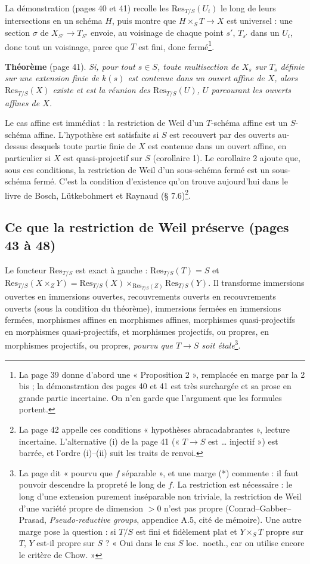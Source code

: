 \documentclass[11pt,a4paper]{article}
\begin{document}
La démonstration (pages 40 et 41) recolle les $\mathrm{Res}_{T/S}(U_i)$ le long de
leurs intersections en un schéma $H$, puis montre que $H \times_S T \to X$ est
universel : une section $\sigma$ de $X_{S'} \to T_{S'}$ envoie, au voisinage de
chaque point $s'$, $T_{s'}$ dans un $U_i$, donc tout un voisinage, parce que
$T$ est fini, donc fermé\footnote{La page 39 donne d'abord une
« Proposition 2 », remplacée en marge par la 2 bis ; la démonstration des
pages 40 et 41 est très surchargée et sa prose en grande partie incertaine.
On n'en garde que l'argument que les formules portent.}.

\textbf{Théorème} (page 41). \emph{Si, pour tout $s \in S$, toute multisection
de $X_s$ sur $T_s$ définie sur une extension finie de $k(s)$ est contenue dans
un ouvert affine de $X$, alors $\mathrm{Res}_{T/S}(X)$ existe et est la réunion
des $\mathrm{Res}_{T/S}(U)$, $U$ parcourant les ouverts affines de $X$.}

Le cas affine est immédiat : la restriction de Weil d'un $T$-schéma affine est
un $S$-schéma affine. L'hypothèse est satisfaite si $S$ est recouvert par
des ouverts au-dessus desquels toute partie finie de $X$ est contenue dans un
ouvert affine, en particulier si $X$ est quasi-projectif sur $S$
(corollaire 1). Le corollaire 2 ajoute que, sous ces conditions, la restriction
de Weil d'un sous-schéma fermé est un sous-schéma fermé. C'est la condition
d'existence qu'on trouve aujourd'hui dans le livre de Bosch, Lütkebohmert et
Raynaud (§ 7.6)\footnote{La page 42 appelle ces conditions « hypothèses
abracadabrantes », lecture incertaine. L'alternative (i) de la page 41 (« $T
\to S$ est \ldots{} injectif ») est barrée, et l'ordre (i)--(ii) suit les
traits de renvoi.}.

\subsection*{Ce que la restriction de Weil préserve (pages 43 à 48)}

Le foncteur $\mathrm{Res}_{T/S}$ est exact à gauche :
$\mathrm{Res}_{T/S}(T) = S$ et $\mathrm{Res}_{T/S}(X \times_Z Y) =
\mathrm{Res}_{T/S}(X) \times_{\mathrm{Res}_{T/S}(Z)} \mathrm{Res}_{T/S}(Y)$. Il
transforme immersions ouvertes en immersions ouvertes, recouvrements ouverts
en recouvrements ouverts (sous la condition du théorème), immersions fermées
en immersions fermées, morphismes affines en morphismes affines,
morphismes quasi-projectifs en morphismes quasi-projectifs, et morphismes
projectifs, ou propres, en morphismes projectifs, ou propres, \emph{pourvu que
$T \to S$ soit étale}\footnote{La page dit « pourvu que $f$ séparable », et
une marge (*) commente : il faut pouvoir descendre la propreté le long de $f$.
La restriction est nécessaire : le long d'une extension purement inséparable
non triviale, la restriction de Weil d'une variété propre de dimension $> 0$
n'est pas propre (Conrad--Gabber--Prasad, \emph{Pseudo-reductive groups},
appendice A.5, cité de mémoire). Une autre marge pose la question : si $T/S$
est fini et fidèlement plat et $Y \times_S T$ propre sur $T$, $Y$ est-il propre
sur $S$ ? « Oui dans le cas $S$ loc.\ noeth., car on utilise encore le critère
de Chow. »}.
\end{document}
